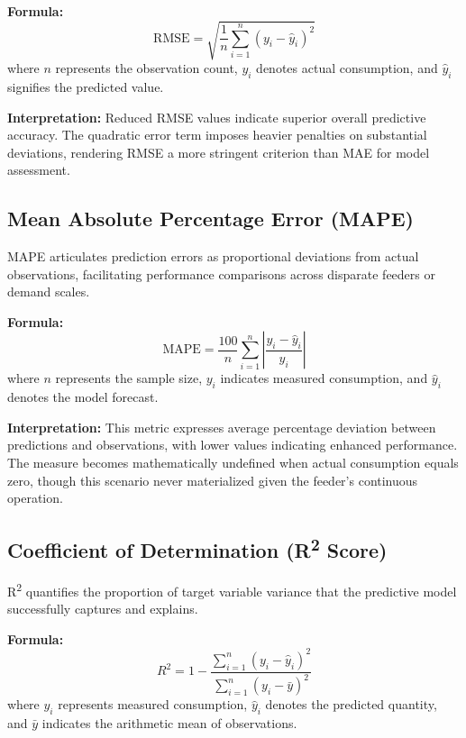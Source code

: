 \documentclass[oneside, 12pt]{book}
\numberwithin{equation}{chapter}
\newcommand{\sizexii}{\fontsize{12pt}{6pt}\selectfont}
\begin{document}
\textbf{Formula:}
\begin{equation}
\text{RMSE} = \sqrt{\frac{1}{n} \sum_{i=1}^{n} (y_i - \hat{y}_i)^2}
\end{equation}
where $n$ represents the observation count, $y_i$ denotes actual consumption, and $\hat{y}_i$ signifies the predicted value.

\textbf{Interpretation:} Reduced RMSE values indicate superior overall predictive accuracy. The quadratic error term imposes heavier penalties on substantial deviations, rendering RMSE a more stringent criterion than MAE for model assessment.

\subsection{\sizexii Mean Absolute Percentage Error (MAPE)}

MAPE articulates prediction errors as proportional deviations from actual observations, facilitating performance comparisons across disparate feeders or demand scales.

\textbf{Formula:}
\begin{equation}
\text{MAPE} = \frac{100}{n} \sum_{i=1}^{n} \left| \frac{y_i - \hat{y}_i}{y_i} \right|
\end{equation}
where $n$ represents the sample size, $y_i$ indicates measured consumption, and $\hat{y}_i$ denotes the model forecast.

\textbf{Interpretation:} This metric expresses average percentage deviation between predictions and observations, with lower values indicating enhanced performance. The measure becomes mathematically undefined when actual consumption equals zero, though this scenario never materialized given the feeder's continuous operation.

\subsection{\sizexii Coefficient of Determination (R\textsuperscript{2} Score)}

R\textsuperscript{2} quantifies the proportion of target variable variance that the predictive model successfully captures and explains.

\textbf{Formula:}
\begin{equation}
R^2 = 1 - \frac{\sum_{i=1}^{n} (y_i - \hat{y}_i)^2}{\sum_{i=1}^{n} (y_i - \bar{y})^2}
\end{equation}
where $y_i$ represents measured consumption, $\hat{y}_i$ denotes the predicted quantity, and $\bar{y}$ indicates the arithmetic mean of observations.
\end{document}
